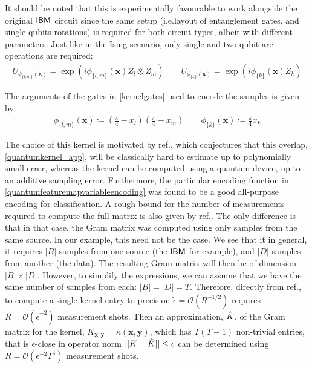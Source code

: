 It should be noted that this is experimentally favourable to work alongside the original $\textsf{IBM}$ circuit since the same setup (i.e.\@ layout of entanglement gates, and single qubits rotations) is required for both circuit types, albeit with different parameters. Just like in the Ising scenario, only single and two-qubit are operations are required:
\begin{align}
	U_{\phi_{\{l,m\}}(\mathbf{x})} = \exp\left(i\phi_{\{l,m\}}	(\mathbf{x})Z_l\otimes Z_m\right) \qquad U_{\phi_{\{k\}}(\mathbf{x})} = \exp\left(i\phi_{\{k\}}(\mathbf{x})Z_k\right) \label{kernelgates}
\end{align}

The arguments of the gates in \eqref{kernelgates} used to encode the samples is given by:
\begin{align}
\phi_{\{l, m\}}(\mathbf{x})   \coloneqq \left(\frac{\pi}{4} - x_l\right)\left(\frac{\pi}{4} - x_m\right) \qquad
\phi_{\{k\}}(\mathbf{x})  \coloneqq \frac{\pi}{4}x_k \label{quantumfeaturemapvariableencoding}
\end{align}

The choice of this kernel is motivated by ref., which conjectures that this overlap, \eqref{quantumkernel_app}, will be classically hard to estimate up to polynomially small error, whereas the kernel can be computed using a quantum device, up to an additive sampling error. Furthermore, the particular encoding function in \eqref{quantumfeaturemapvariableencoding} was found to be a good all-purpose encoding for classification. A rough bound for the number of measurements required to compute the full matrix is also given by ref.. The only difference is that in that case, the Gram matrix was computed using only samples from the same source. In our example, this need not be the case. We see that it in general, it requires $|B|$ samples from one source (the $\textsf{IBM}$ for example), and $|D|$ samples from another (the data). The resulting Gram matrix will then be of dimension $|B| \times |D|$. However, to simplify the expressions, we can assume that we have the same number of samples from each: $|B| = |D| = T$. Therefore, directly from ref., to compute a single kernel entry to precision $\tilde{\epsilon} = \mathcal{O}(R^{-1/2})$ requires $R  = \mathcal{O}(\tilde{\epsilon}^{-2})$ measurement shots. Then an approximation, $\Hat{K}$, of the Gram matrix for the kernel, $K_{\mathbf{x}, \mathbf{y}} = \kappa(\mathbf{x}, \mathbf{y})$, which has $T(T - 1)$  non-trivial entries, that is $\epsilon$-close in operator norm $||K - \Hat{K}|| \leq \epsilon$ can be determined using $R = \mathcal{O}(\epsilon^{-2}T^4)$ measurement shots.

